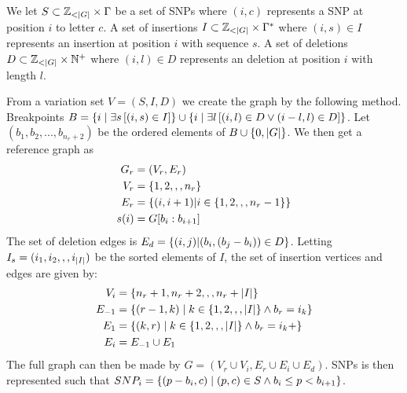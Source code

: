 We let $S \subset \mathbb{Z} _{<\left|G\right|} \times \Gamma $ be a set of SNPs  where $(i, c)$ represents a SNP at position $i$ to letter $c$. 
A set of insertions $I \subset \mathbb{Z} _{<\left|G\right|} \times \Gamma^*$ where $(i, s) \in I$ represents an insertion at position $i$ with sequence $s$.
A set of deletions $D \subset \mathbb{Z} _{<\left|G\right|} \times \mathbb{N}^+$ where $(i, l) \in D$ represents an deletion at position $i$ with length $l$.

From a variation set $V=(S, I, D)$ we create the graph by the following method.
Breakpoints $B = \left\{i \mid \exists s \left[(i, s) \in I\right]\right\} \cup \left\{i \mid \exists l \left[(i, l) \in D \vee (i-l, l) \in D\right]\right\}$.
Let $(b_1, b_2, ..., b_{n_r+2})$ be the ordered elements of $B \cup \left\{0, \left|G\right|\right\}$. We then get a reference graph as
\begin{align*}
  G_r &= (V_r, E_r)\\
  V_r &= \left\{1, 2,,, n_r\right\}\\
  E_r &= \left\{(i, i+1) | i \in \left\{1,2,,,n_r-1\right\}\right\}\\
  s(i) &= G[b_i:b_{i+1}]
\end{align*}
The set of deletion edges is $E_d=\left\{(i, j) | (b_i, (b_j-b_i)) \in D\right\}$. 
Letting $I_s = (i_1, i_2,,, i_{\left|I\right|})$ be the sorted elements of $I$, the set of insertion vertices and edges are given by:
  \begin{align*}
    V_i &= \left\{n_r+1, n_r+2,,, n_r+\left|I\right|\right\}\\
    E_{-1} &= \left\{(r-1, k) \mid k \in \left\{1, 2,,,\left|I\right|\right\} \wedge b_r=i_k\right\}\\
    E_{1} &= \left\{(k, r) \mid k \in \left\{1, 2,,,\left|I\right|\right\} \wedge b_r=i_k+\right\}\\
    E_i &= E_{-1} \cup E_1\\
  \end{align*}
The full graph can then be made by $G = (V_r \cup V_i, E_r \cup E_i \cup E_d)$.
SNPs is then represented such that $SNP_i = \left\{(p-b_i, c) \mid (p, c) \in S \wedge b_i\leq p < b_{i+1}\right\}$. 


